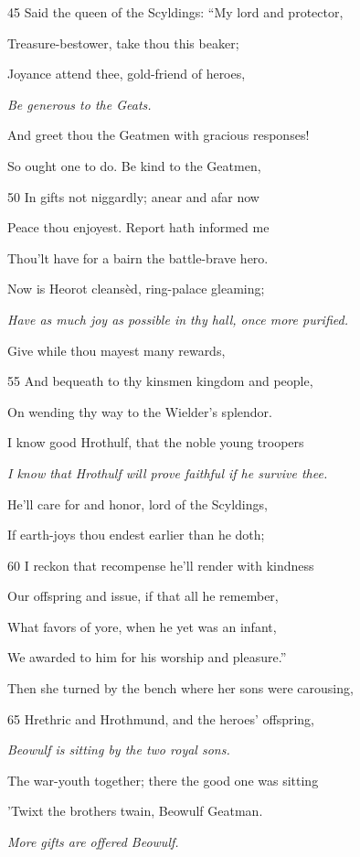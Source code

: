 45
Said the queen of the Scyldings: “My lord and protector,

Treasure-bestower, take thou this beaker;

Joyance attend thee, gold-friend of heroes,

\emph{Be generous to
the Geats.}

And greet thou the Geatmen with gracious responses!

So ought one to do. Be kind to the Geatmen,

50
In gifts not niggardly; anear and afar now

Peace thou enjoyest. Report hath informed me

Thou’lt have for a bairn the battle-brave hero.

Now is Heorot cleansèd, ring-palace gleaming;

\emph{Have as much joy
as possible in thy
hall, once more
purified.}

Give while thou mayest many rewards,

55
And bequeath to thy kinsmen kingdom and people,

On wending thy way to the Wielder’s splendor.

I know good Hrothulf, that the noble young troopers

\emph{I know that Hrothulf
will prove faithful
if he survive
thee.}

He’ll care for and honor, lord of the Scyldings,

If earth-joys thou endest earlier than he doth;

60
I reckon that recompense he’ll render with kindness

Our offspring and issue, if that all he remember,

What favors of yore, when he yet was an infant,

We awarded to him for his worship and pleasure.”

Then she turned by the bench where her sons were carousing,

65
Hrethric and Hrothmund, and the heroes’ offspring,

\emph{Beowulf is sitting
by the two royal
sons.}

The war-youth together; there the good one was sitting

’Twixt the brothers twain, Beowulf Geatman.



\emph{More gifts are offered
Beowulf.}

